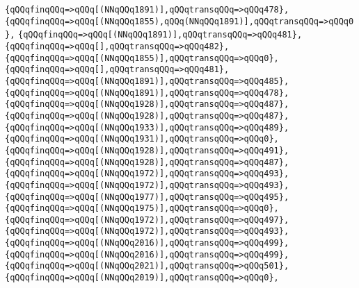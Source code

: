 \verb|{qQQqfinqQQq=>qQQq[(NNqQQq1891)],qQQqtransqQQq=>qQQq478},|\newline
\verb|{qQQqfinqQQq=>qQQq[(NNqQQq1855),qQQq(NNqQQq1891)],qQQqtransqQQq=>qQQq0},|\newline
\verb|{qQQqfinqQQq=>qQQq[(NNqQQq1891)],qQQqtransqQQq=>qQQq481},|\newline
\verb|{qQQqfinqQQq=>qQQq[],qQQqtransqQQq=>qQQq482},|\newline
\verb|{qQQqfinqQQq=>qQQq[(NNqQQq1855)],qQQqtransqQQq=>qQQq0},|\newline
\verb|{qQQqfinqQQq=>qQQq[],qQQqtransqQQq=>qQQq481},|\newline
\verb|{qQQqfinqQQq=>qQQq[(NNqQQq1891)],qQQqtransqQQq=>qQQq485},|\newline
\verb|{qQQqfinqQQq=>qQQq[(NNqQQq1891)],qQQqtransqQQq=>qQQq478},|\newline
\verb|{qQQqfinqQQq=>qQQq[(NNqQQq1928)],qQQqtransqQQq=>qQQq487},|\newline
\verb|{qQQqfinqQQq=>qQQq[(NNqQQq1928)],qQQqtransqQQq=>qQQq487},|\newline
\verb|{qQQqfinqQQq=>qQQq[(NNqQQq1933)],qQQqtransqQQq=>qQQq489},|\newline
\verb|{qQQqfinqQQq=>qQQq[(NNqQQq1931)],qQQqtransqQQq=>qQQq0},|\newline
\verb|{qQQqfinqQQq=>qQQq[(NNqQQq1928)],qQQqtransqQQq=>qQQq491},|\newline
\verb|{qQQqfinqQQq=>qQQq[(NNqQQq1928)],qQQqtransqQQq=>qQQq487},|\newline
\verb|{qQQqfinqQQq=>qQQq[(NNqQQq1972)],qQQqtransqQQq=>qQQq493},|\newline
\verb|{qQQqfinqQQq=>qQQq[(NNqQQq1972)],qQQqtransqQQq=>qQQq493},|\newline
\verb|{qQQqfinqQQq=>qQQq[(NNqQQq1977)],qQQqtransqQQq=>qQQq495},|\newline
\verb|{qQQqfinqQQq=>qQQq[(NNqQQq1975)],qQQqtransqQQq=>qQQq0},|\newline
\verb|{qQQqfinqQQq=>qQQq[(NNqQQq1972)],qQQqtransqQQq=>qQQq497},|\newline
\verb|{qQQqfinqQQq=>qQQq[(NNqQQq1972)],qQQqtransqQQq=>qQQq493},|\newline
\verb|{qQQqfinqQQq=>qQQq[(NNqQQq2016)],qQQqtransqQQq=>qQQq499},|\newline
\verb|{qQQqfinqQQq=>qQQq[(NNqQQq2016)],qQQqtransqQQq=>qQQq499},|\newline
\verb|{qQQqfinqQQq=>qQQq[(NNqQQq2021)],qQQqtransqQQq=>qQQq501},|\newline
\verb|{qQQqfinqQQq=>qQQq[(NNqQQq2019)],qQQqtransqQQq=>qQQq0},|\newline
